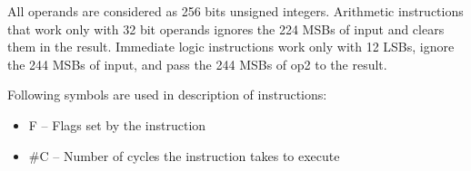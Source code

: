 \documentclass{tropic_design_spec}
\begin{document}

All operands are considered as 256 bits unsigned integers. Arithmetic instructions that work only with 32 bit
operands ignores the 224 MSBs of input and clears them in the result. Immediate logic instructions work only
with 12 LSBs, ignore the 244 MSBs of input, and pass the 244 MSBs of op2 to the result.





Following symbols are used in description of instructions:
\begin{itemize}
    \item{F -- Flags set by the instruction}
    \item{\#C -- Number of cycles the instruction takes to execute}
\end{itemize}
\end{document}
